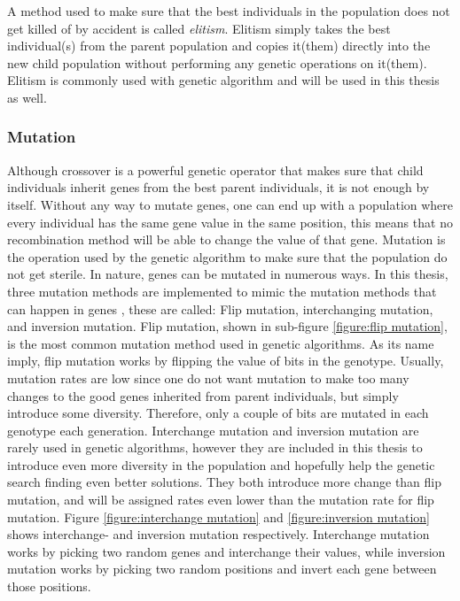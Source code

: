 \noindent A method used to make sure that the best individuals in the population does not get killed of by accident is called \textit{elitism}. Elitism simply takes the best individual(s) from the parent population and copies it(them) directly into the new child population without performing any genetic operations on it(them). Elitism is commonly used with genetic algorithm and will be used in this thesis as well. 


\subsubsection{Mutation}
Although crossover is a powerful genetic operator that makes sure that child individuals inherit genes from the best parent individuals, it is not enough by itself. Without any way to mutate genes, one can end up with a population where every individual has the same gene value in the same position, this means that no recombination method will be able to change the value of that gene. Mutation is the operation used by the genetic algorithm to make sure that the population do not get sterile. In nature, genes can be mutated in numerous ways. In this thesis, three mutation methods are implemented to mimic the mutation methods that can happen in genes \citep{Soni}, these are called: Flip mutation, interchanging mutation, and inversion mutation. Flip mutation, shown in sub-figure \ref{figure:flip mutation}, is the most common mutation method used in genetic algorithms. As its name imply, flip mutation works by flipping the value of bits in the genotype. Usually, mutation rates are low since one do not want mutation to make too many changes to the good genes inherited from parent individuals, but simply introduce some diversity. Therefore, only a couple of bits are mutated in each genotype each generation. Interchange mutation and inversion mutation are rarely used in genetic algorithms, however they are included in this thesis to introduce even more diversity in the population and hopefully help the genetic search finding even better solutions. They both introduce more change than flip mutation, and will be assigned rates even lower than the mutation rate for flip mutation. Figure \ref{figure:interchange mutation} and \ref{figure:inversion mutation} shows interchange- and inversion mutation respectively. Interchange mutation works by picking two random genes and interchange their values, while inversion mutation works by picking two random positions and invert each gene between those positions. 


